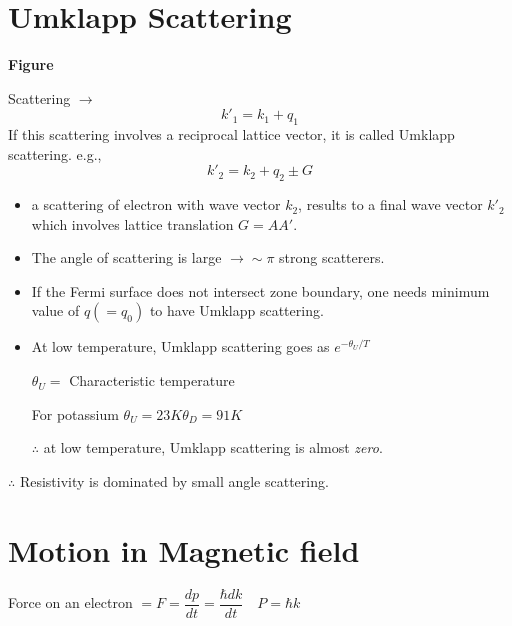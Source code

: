 \section*{Umklapp Scattering}
\begin{center}
{\bf Figure}
\end{center}

Scattering $\to$
$$
k'_{1}=k_{1}+q_{1}
$$
If this scattering involves a reciprocal lattice vector, it is called Umklapp scattering. e.g.,
$$
k'_{2}=k_{2}+q_{2}\pm G
$$
\begin{itemize}
\item a scattering of electron with wave vector $k_{2}$, results to a final wave vector $k'_{2}$ which involves lattice translation $G=AA'$.

\item The angle of scattering is large $\to \sim \pi$ strong scatterers.

\item If the Fermi surface does not intersect zone boundary, one needs minimum value of $q(=q_{0})$ to have Umklapp scattering.

\item At low temperature, Umklapp scattering goes as $e^{-\theta_{U}/T}$

$\theta_{U}=$ Characteristic temperature

For potassium $\theta_{U}=23K$\quad $\theta_{D}=91K$

$\therefore$ at low temperature, Umklapp scattering is almost {\em zero}.
\end{itemize}
$\therefore$ Resistivity is dominated by small angle scattering.

\section{Motion in Magnetic field}

Force on an electron $=F=\dfrac{dp}{dt}=\dfrac{\hbar dk}{dt}\quad P=\hbar k$

